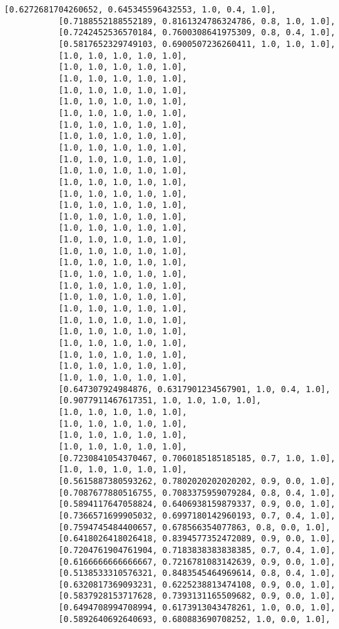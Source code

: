 \documentclass[11pt]{article}
\begin{document}
\begin{Verbatim}[commandchars=\\\{\}]
           [0.6272681704260652, 0.645345596432553, 1.0, 0.4, 1.0],
           [0.7188552188552189, 0.8161324786324786, 0.8, 1.0, 1.0],
           [0.7242452536570184, 0.7600308641975309, 0.8, 0.4, 1.0],
           [0.5817652329749103, 0.6900507236260411, 1.0, 1.0, 1.0],
           [1.0, 1.0, 1.0, 1.0, 1.0],
           [1.0, 1.0, 1.0, 1.0, 1.0],
           [1.0, 1.0, 1.0, 1.0, 1.0],
           [1.0, 1.0, 1.0, 1.0, 1.0],
           [1.0, 1.0, 1.0, 1.0, 1.0],
           [1.0, 1.0, 1.0, 1.0, 1.0],
           [1.0, 1.0, 1.0, 1.0, 1.0],
           [1.0, 1.0, 1.0, 1.0, 1.0],
           [1.0, 1.0, 1.0, 1.0, 1.0],
           [1.0, 1.0, 1.0, 1.0, 1.0],
           [1.0, 1.0, 1.0, 1.0, 1.0],
           [1.0, 1.0, 1.0, 1.0, 1.0],
           [1.0, 1.0, 1.0, 1.0, 1.0],
           [1.0, 1.0, 1.0, 1.0, 1.0],
           [1.0, 1.0, 1.0, 1.0, 1.0],
           [1.0, 1.0, 1.0, 1.0, 1.0],
           [1.0, 1.0, 1.0, 1.0, 1.0],
           [1.0, 1.0, 1.0, 1.0, 1.0],
           [1.0, 1.0, 1.0, 1.0, 1.0],
           [1.0, 1.0, 1.0, 1.0, 1.0],
           [1.0, 1.0, 1.0, 1.0, 1.0],
           [1.0, 1.0, 1.0, 1.0, 1.0],
           [1.0, 1.0, 1.0, 1.0, 1.0],
           [1.0, 1.0, 1.0, 1.0, 1.0],
           [1.0, 1.0, 1.0, 1.0, 1.0],
           [1.0, 1.0, 1.0, 1.0, 1.0],
           [1.0, 1.0, 1.0, 1.0, 1.0],
           [1.0, 1.0, 1.0, 1.0, 1.0],
           [1.0, 1.0, 1.0, 1.0, 1.0],
           [0.647307924984876, 0.6317901234567901, 1.0, 0.4, 1.0],
           [0.9077911467617351, 1.0, 1.0, 1.0, 1.0],
           [1.0, 1.0, 1.0, 1.0, 1.0],
           [1.0, 1.0, 1.0, 1.0, 1.0],
           [1.0, 1.0, 1.0, 1.0, 1.0],
           [1.0, 1.0, 1.0, 1.0, 1.0],
           [0.7230841054370467, 0.7060185185185185, 0.7, 1.0, 1.0],
           [1.0, 1.0, 1.0, 1.0, 1.0],
           [0.5615887380593262, 0.7802020202020202, 0.9, 0.0, 1.0],
           [0.7087677880516755, 0.7083375959079284, 0.8, 0.4, 1.0],
           [0.5894117647058824, 0.6406938159879337, 0.9, 0.0, 1.0],
           [0.7366571699905032, 0.6997180142960193, 0.7, 0.4, 1.0],
           [0.7594745484400657, 0.678566354077863, 0.8, 0.0, 1.0],
           [0.6418026418026418, 0.8394577352472089, 0.9, 0.0, 1.0],
           [0.7204761904761904, 0.7183838383838385, 0.7, 0.4, 1.0],
           [0.6166666666666667, 0.7216781083142639, 0.9, 0.0, 1.0],
           [0.5138533310576321, 0.8483545464969614, 0.8, 0.4, 1.0],
           [0.6320817369093231, 0.6225238813474108, 0.9, 0.0, 1.0],
           [0.5837928153717628, 0.7393131165509682, 0.9, 0.0, 1.0],
           [0.6494708994708994, 0.6173913043478261, 1.0, 0.0, 1.0],
           [0.5892640692640693, 0.680883690708252, 1.0, 0.0, 1.0],

\end{Verbatim}
\end{document}
